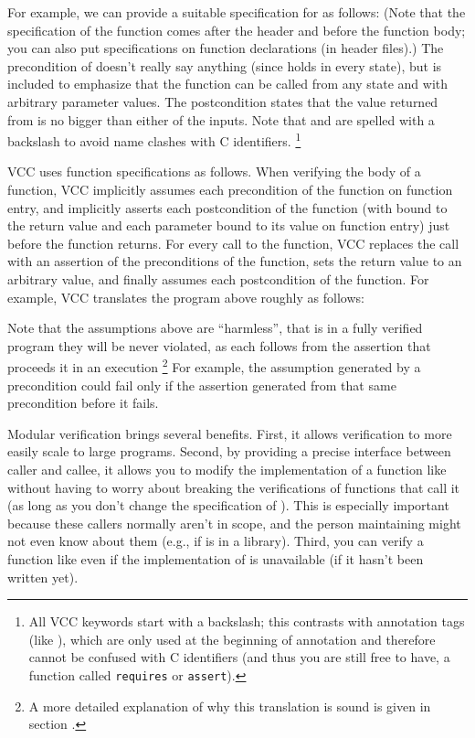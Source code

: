 For example, we can provide a suitable specification for  as
follows:
\noindent
(Note that the specification of the function comes after the header and
before the function body; you can also put specifications on function
declarations (\eg in header files).)
The precondition  of  doesn't
really say anything (since \vcc{\true} holds in every state), but is included
to emphasize that the function can be called from any state and
with arbitrary parameter values.
The postcondition states that the value returned from  
is no bigger than either of the inputs.
Note that \vcc{\true} and \vcc{\result} are spelled with a backslash
to avoid name clashes with C identifiers.%
\footnote{
  All VCC keywords start with a backslash; 
  this contrasts with annotation tags (like ),
  which are only used at the beginning of annotation
  and therefore cannot be confused with C identifiers
  (and thus you are still free to have, \eg
  a function called \lstinline{requires} or \lstinline{assert}).}

VCC uses function specifications as follows. When verifying the body of a
function, VCC implicitly assumes each precondition of the function on
function entry, and implicitly asserts each postcondition of the
function (with \vcc{\result} bound to the return value and each
parameter bound to its value on function entry) just before the
function returns. For every call to the function, VCC replaces the
call with an assertion of the preconditions of the function, sets the
return value to an arbitrary value, and finally assumes each
postcondition of the function. 
For example, VCC translates the program above roughly as follows:

Note that the assumptions above are ``harmless'', that is in a fully
verified program they will be never violated, as each follows
from the  assertion that proceeds it in an execution%
\footnote{
A more detailed explanation of why this translation is sound is given in section .
}%
For example, the  assumption generated by a precondition could fail only if the 
assertion generated from that same precondition  before it fails.

\begin{note}
Modular verification brings several benefits. 
First, it allows verification to more easily scale to
large programs. Second, by providing a precise interface between
caller and callee, it allows you to modify the implementation of
a function like  without having to worry about breaking the
verifications of functions that call it (as long as you don't change
the specification of ). This is especially important
because these callers normally aren't in scope, and the person
maintaining  might not even know about them (e.g., if
 is in a library). Third, you can verify a function like
 even if the implementation of  is unavailable
(\eg if it hasn't been written yet). 
\end{note}

